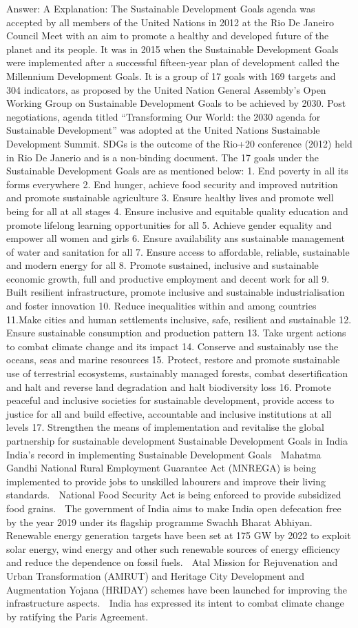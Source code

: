 Answer: A
Explanation: The Sustainable Development Goals agenda was accepted by all members of the United Nations in 2012 at the Rio De Janeiro Council Meet with an aim to promote a healthy and developed future of the planet and its people. It was in 2015 when the Sustainable Development Goals were implemented after a successful fifteen-year plan of development called the Millennium Development Goals. It is a group of 17 goals with 169 targets and 304 indicators, as proposed by the United Nation General Assembly’s Open Working Group on Sustainable Development Goals to be achieved by 2030. Post negotiations, agenda titled “Transforming Our World: the 2030 agenda for Sustainable Development” was adopted at the United Nations Sustainable Development Summit. SDGs is the outcome of the Rio+20 conference (2012) held in Rio De Janerio and is a non-binding document. The 17 goals under the Sustainable Development Goals are as mentioned below: 1. End poverty in all its forms everywhere 2. End hunger, achieve food security and improved nutrition and promote sustainable agriculture 3. Ensure healthy lives and promote well being for all at all stages 4. Ensure inclusive and equitable quality education and promote lifelong learning opportunities for all 5. Achieve gender equality and empower all women and girls 6. Ensure availability ans sustainable management of water and sanitation for all 7. Ensure access to affordable, reliable, sustainable and modern energy for all 8. Promote sustained, inclusive and sustainable economic growth, full and productive employment and decent work for all 9. Built resilient infrastructure, promote inclusive and sustainable industrialisation and foster innovation 10. Reduce inequalities within and among countries 11.Make cities and human settlements inclusive, safe, resilient and sustainable 12. Ensure sustainable consumption and production pattern 13. Take urgent actions to combat climate change and its impact 14. Conserve and sustainably use the oceans, seas and marine resources 15. Protect, restore and promote sustainable use of terrestrial ecosystems, sustainably managed forests, combat desertification and halt and reverse land degradation and halt biodiversity loss 16. Promote peaceful and inclusive societies for sustainable development, provide access to justice for all and build effective, accountable and inclusive institutions at all levels 17. Strengthen the means of implementation and revitalise the global partnership for sustainable development Sustainable Development Goals in India India’s record in implementing Sustainable Development Goals  Mahatma Gandhi National Rural Employment Guarantee Act (MNREGA) is being implemented to provide jobs to unskilled labourers and improve their living standards.  National Food Security Act is being enforced to provide subsidized food grains.  The government of India aims to make India open defecation free by the year 2019 under its flagship programme Swachh Bharat Abhiyan.  Renewable energy generation targets have been set at 175 GW by 2022 to exploit solar energy, wind energy and other such renewable sources of energy efficiency and reduce the dependence on fossil fuels.  Atal Mission for Rejuvenation and Urban Transformation (AMRUT) and Heritage City Development and Augmentation Yojana (HRIDAY) schemes have been launched for improving the infrastructure aspects.  India has expressed its intent to combat climate change by ratifying the Paris Agreement. 